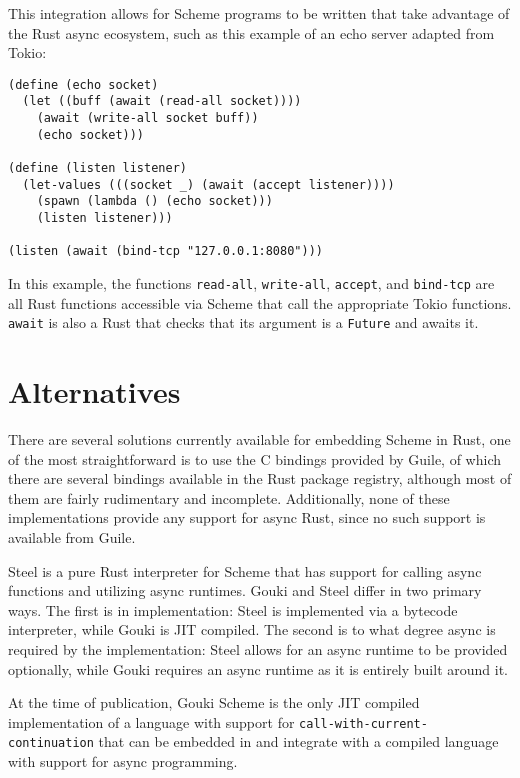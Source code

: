\documentclass[sigplan,review,anonymous]{acmart}
\begin{document}
This integration allows for Scheme programs to be written that take advantage
of the Rust async ecosystem, such as this example of an echo server adapted
from Tokio\cite{tokio}:

\begin{verbatim}
(define (echo socket)
  (let ((buff (await (read-all socket))))
    (await (write-all socket buff))
    (echo socket)))

(define (listen listener)
  (let-values (((socket _) (await (accept listener))))
    (spawn (lambda () (echo socket)))
    (listen listener)))

(listen (await (bind-tcp "127.0.0.1:8080")))
\end{verbatim}

In this example, the functions \texttt{read-all}, \texttt{write-all},
\texttt{accept}, and \texttt{bind-tcp} are all Rust functions accessible via
Scheme that call the appropriate Tokio functions. \texttt{await} is also
a Rust that checks that its argument is a \texttt{Future}\cite{future} and
awaits it.

\section{Alternatives}

There are several solutions currently available for embedding Scheme in Rust,
one of the most straightforward is to use the C bindings provided by Guile, of
which there are several bindings available in the Rust package registry,
although most of them are fairly rudimentary and incomplete. Additionally, none
of these implementations provide any support for async Rust, since no such
support is available from Guile.

Steel\cite{steel} is a pure Rust interpreter for Scheme that has support for
calling async functions and utilizing async runtimes. Gouki and Steel differ in
two primary ways. The first is in implementation: Steel is implemented via a
bytecode interpreter, while Gouki is JIT compiled. The second is to what degree
async is required by the implementation: Steel allows for an async runtime to
be provided optionally, while Gouki requires an async runtime as it is entirely
built around it.

At the time of publication, Gouki Scheme is the only JIT compiled implementation
of a language with support for \texttt{call-with-current-continuation} that can
be embedded in and integrate with a compiled language with support for async
programming.
\end{document}
